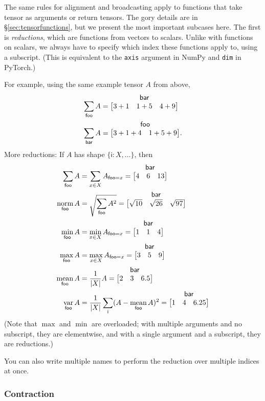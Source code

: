 \documentclass{article}
\makeatletter
\newcommand{\name}[1]{\mathsf{#1}}
\newcommand{\nidx}[2]{\name{#1}=#2}
\newcommand{\nset}[2]{\name{#1}:#2}
\newcommand{\nsum}[1]{\mathop{\sum}_{\name{#1}}}
\newcommand{\nfun}[2]{\mathop{\text{#2}}\limits_{\name{#1}}}
\newcommand{\tuple}[1]{\{ #1\}}
\newcommand{\nmatrix}[3]{\name{#1}\begin{array}[b]{@{}c@{}}\name{#2}\\\begin{bmatrix}#3\end{bmatrix}\end{array}}
\makeatother
\begin{document}
The same rules for alignment and broadcasting apply to functions that take tensor as arguments or return tensors. The gory details are in \S\ref{sec:tensorfunctions}, but we present the most important subcases here. The first is \emph{reductions}, which are functions from vectors to scalars. Unlike with functions on scalars, we always have to specify which index these functions apply to, using a subscript. (This is equivalent to the \verb|axis| argument in NumPy and \verb|dim| in PyTorch.)

For example, using the same example tensor $A$ from above,
\begin{align*}
\nsum{foo} A &= \nmatrix{}{bar}{
  3+1 & 1+5 & 4+9
} \\
\nsum{bar} A &= \nmatrix{}{foo}{
  3+1+4 & 1+5+9
}.
\end{align*}
More reductions: If $A$ has shape $\tuple{\nset{i}{X}, \ldots}$, then
\begin{align*}
  \nsum{foo} A &= \sum_{x \in X} A_{\nidx{foo}{x}} = \nmatrix{}{bar}{4 & 6 & 13} \\
  \nfun{foo}{norm} A &= \sqrt{\nsum{foo} A^2} = \nmatrix{}{bar}{\sqrt{10} & \sqrt{26} & \sqrt{97}} \\
  \nfun{foo}{min} A &= \min_{x \in X} A_{\nidx{foo}{x}} = \nmatrix{}{bar}{1 & 1 & 4} \\
  \nfun{foo}{max} A &= \max_{x \in X} A_{\nidx{foo}{x}} = \nmatrix{}{bar}{3 & 5 & 9} \\
  \nfun{foo}{mean} A &= \frac{1}{|X|} A = \nmatrix{}{bar}{2 & 3 & 6.5} \\
  \nfun{foo}{var} A &= \frac1{|X|} \nsum{i} (A - \nfun{foo}{mean} A)^2 = \nmatrix{}{bar}{1 & 4 & 6.25}
\end{align*}
(Note that $\max$ and $\min$ are overloaded; with multiple arguments and no subscript, they are elementwise, and with a single argument and a subscript, they are reductions.)

You can also write multiple names to perform the reduction over multiple indices at once.

\subsubsection{Contraction}
\end{document}
